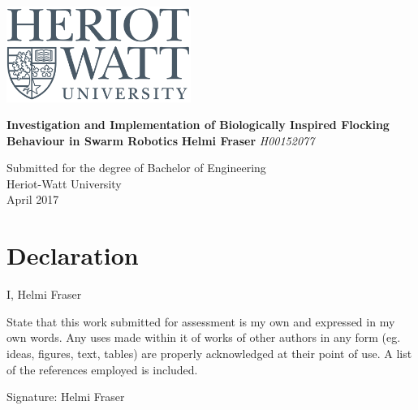 \documentclass[a4paper,12pt]{report}
\begin{document}


\cfoot{\thepage}



\thispagestyle{empty}
\begin{flushright}
\includegraphics[width=6cm]{HW_logo}
\end{flushright}	
\vskip40mm
\begin{center}
\huge\textbf{Investigation and Implementation of Biologically Inspired Flocking Behaviour in Swarm Robotics}
\vskip7mm
\Large\textbf{Helmi Fraser}
\vskip1mm
\Large\textit{H00152077}
\normalsize
\end{center}
\vfill
\begin{flushleft}
\large
Submitted for the degree of Bachelor of Engineering \\
Heriot-Watt University	\\
April 2017
\end{flushleft}		


\chapter*{Declaration}
I, Helmi Fraser

State that this work submitted for assessment is my own and expressed in my own words. Any uses made within it of works of other authors in any form (eg. ideas, figures, text, tables) are properly acknowledged at their point of use. A list of the references employed is included.

\vskip5mm
Signature:
\vskip20mm
Helmi Fraser
\end{document}
